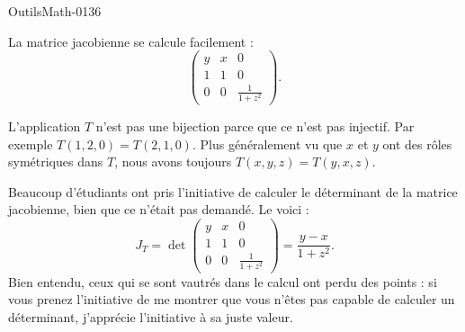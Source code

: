 
\begin{corrige}{OutilsMath-0136}

La matrice jacobienne se calcule facilement :
\begin{equation}
    \begin{pmatrix}
        y    &   x    &   0    \\
        1    &   1    &   0    \\
        0    &   0    &   \frac{1}{ 1+z^2 }
    \end{pmatrix}.
\end{equation}

L'application \( T\) n'est pas une bijection parce que ce n'est pas injectif. Par exemple \( T(1,2,0)=T(2,1,0)\). Plus généralement vu que \( x\) et \( y\) ont des rôles symétriques dans \( T\), nous avons toujours \( T(x,y,z)=T(y,x,z)\).


Beaucoup d'étudiants ont pris l'initiative de calculer le déterminant de la matrice jacobienne, bien que ce n'était pas demandé. Le voici :
\begin{equation}
    J_T=\det\begin{pmatrix}
        y    &   x    &   0    \\
        1    &   1    &   0    \\
        0    &   0    &   \frac{1}{ 1+z^2 }
    \end{pmatrix}=\frac{ y-x }{ 1+z^2 }.
\end{equation}
Bien entendu, ceux qui se sont vautrés dans le calcul ont perdu des points : si vous prenez l'initiative de me montrer que vous n'êtes pas capable de calculer un déterminant, j'apprécie l'initiative à sa juste valeur.

\end{corrige}
